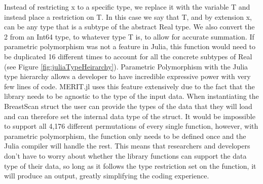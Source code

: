 Instead of restricting x to a specific type, we replace it with the variable T and instead place a restriction on T. In
this case we say that T, and by extension x, can be any type that is a subtype of the abstract Real type. We also
convert the 2 from an Int64 type, to whatever type T is, to allow for accurate summation. If parametric polymorphism was
not a feature in Julia, this function would need to be duplicated 16 different times to account for all the concrete
subtypes of Real (see Figure \ref{fig:juliaTypeHeirarchy}). Parametric Polymorphism with the Julia type hierarchy allows
a developer to have incredible expressive power with very few lines of code. \hfill \break 
MERIT.jl uses this feature extensively due to the fact that the library needs to be agnostic to the type of the input
data. When instantiating the BreastScan struct the user can provide the types of the data that they will load and can
therefore set the internal data type of the struct. It would be impossible to support all 4,176 different permutations
of every single function, however, with parametric polymorphism, the function only needs to be defined once and the Julia
compiler will handle the rest. This means that researchers and developers don't have to worry about whether the library
functions can support the data type of their data, so long as it follows the type restriction set on the function, it
will produce an output, greatly simplifying the coding experience.  

